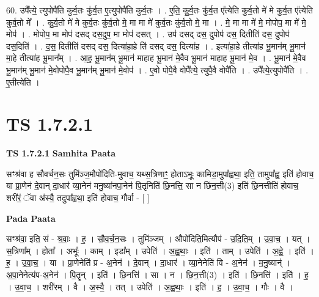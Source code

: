 \documentclass[17pt]{extarticle}
\begin{document}
60. उपै᳚त्ये॒ त्युपोपै॑ति कुर्व॒तः कु॑र्व॒त ए॒त्युपोपै॑ति कुर्व॒तः । . ए॒ति॒ कु॒र्व॒तः कु॑र्व॒त ए᳚त्येति कुर्व॒तो मे॑ मे कुर्व॒त ए᳚त्येति कुर्व॒तो मे᳚ । . कु॒र्व॒तो मे॑ मे कुर्व॒तः कु॑र्व॒तो मे॒ मा मा मे॑ कुर्व॒तः कु॑र्व॒तो मे॒ मा । . मे॒ मा मा मे॑ मे॒ मोपोप॒ मा मे॑ मे॒ मोप॑ । . मोपोप॒ मा मोप॑ दसद् दस॒दुप॒ मा मोप॑ दसत् । . उप॑ दसद् दस॒ दुपोप॑ दस॒ दितीति॑ दस॒ दुपोप॑ दस॒दिति॑ । . द॒स॒ दितीति॑ दसद् दस॒ दित्या॑हा॒हे ति॑ दसद् दस॒ दित्या॑ह । . इत्या॑हा॒हे तीत्या॑ह भू॒मान॑म् भू॒मान॑ मा॒हे तीत्या॑ह भू॒मान᳚म् । . आ॒ह॒ भू॒मान॑म् भू॒मान॑ माहाह भू॒मान॑ मे॒वैव भू॒मान॑ माहाह भू॒मान॑ मे॒व । . भू॒मान॑ मे॒वैव भू॒मान॑म् भू॒मान॑ मे॒वोपोपै॒व भू॒मान॑म् भू॒मान॑ मे॒वोप॑ । . ए॒वो पोपै॒वै वोपै᳚त्ये॒ त्युपै॒वै वोपै॑ति । . उपै᳚त्ये॒त्युपोपै॑ति । . ए॒तीत्ये॑ति । \newline
\pagebreak
{}
\section*{ TS 1.7.2.1 }

\textbf{TS 1.7.2.1 } \newline
\textbf{Samhita Paata} \newline

सꣳश्र॑वा ह सौवर्चन॒सः तुमि॑ञ्ज॒मौपो॑दिति-मुवाच॒ यथ्स॒त्रिणाꣳ॒॒ होताऽभूः॒ कामिडा॒मुपा᳚ह्वथा॒ इति॒ तामुपा᳚ह्व॒ इति॑ होवाच॒ या प्रा॒णेन॑ दे॒वान् दा॒धार॑ व्या॒नेन॑ मनु॒ष्या॑नपा॒नेन॑ पि॒तृनिति॑ छि॒नत्ति॒ सा न छि॑न॒त्ती(3) इति॑ छि॒नत्तीति॑ होवाच॒ शरी॑रं॒ ॅवा अ॑स्यै॒ तदुपा᳚ह्वथा॒ इति॑ होवाच॒ गौर्वा - [ ] \newline

\textbf{Pada Paata} \newline

सꣳश्र॑वा॒ इति॒ सं - श्र॒वाः॒ । ह॒ । सौ॒व॒र्च॒न॒सः । तुमि॑ञ्जम् । औपो॑दिति॒मित्यौप॑ - उ॒दि॒ति॒म् । उ॒वा॒च॒ । यत् । स॒त्रिणा᳚म् । होता᳚ । अभूः᳚ । काम् । इडा᳚म् । उपेति॑ । अ॒ह्व॒थाः॒ । इति॑ । ताम् । उपेति॑ । अ॒ह्वे॒ । इति॑ । ह॒ । उ॒वा॒च॒ । या । प्रा॒णेनेति॑ प्र - अ॒नेन॑ । दे॒वान् । दा॒धार॑ । व्या॒नेनेति॑ वि - अ॒नेन॑ । म॒नु॒ष्यान्॑ । अ॒पा॒नेनेत्य॑प-अ॒नेन॑ । पि॒तॄन् । इति॑ । छि॒नत्ति॑ । सा । न । छि॒न॒त्ती(3) । इति॑ । छि॒नत्ति॑ । इति॑ । ह॒ । उ॒वा॒च॒ । शरी॑रम् । वै । अ॒स्यै॒ । तत् । उपेति॑ । अ॒ह्व॒थाः॒ । इति॑ । ह॒ । उ॒वा॒च॒ । गौः । वै ।  \newline
\end{document}
